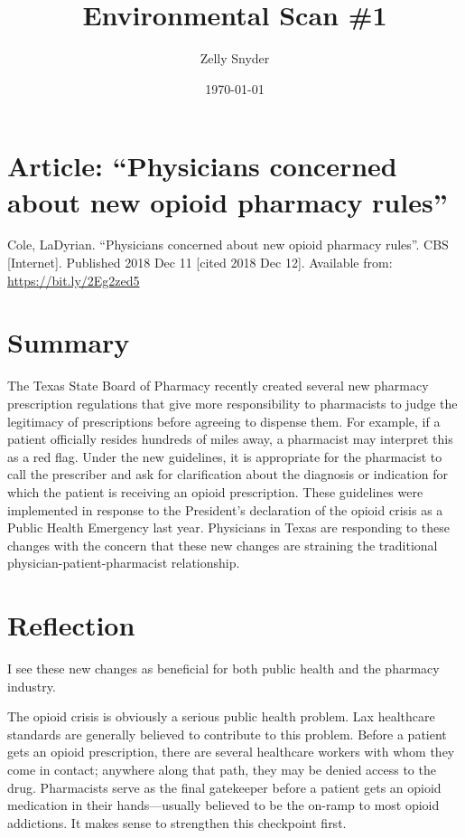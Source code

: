\documentclass[11.5pt]{article}
\begin{document}
\title{Environmental Scan \#1}
\author{Zelly Snyder}
\date{\today}
\maketitle

\section{Article: ``Physicians concerned about new opioid pharmacy rules''}
Cole, LaDyrian. ``Physicians concerned about new opioid pharmacy rules''. CBS [Internet]. Published 2018 Dec 11 [cited 2018 Dec 12]. Available from: \href{https://www.cbs19.tv/article/news/local/physicians-concerned-about-new-opioid-pharmacy-rules/501-623011135}{https://bit.ly/2Eg2zed5}

\section{Summary}
The Texas State Board of Pharmacy recently created several new pharmacy prescription regulations that give more responsibility to pharmacists to judge the legitimacy of prescriptions before agreeing to dispense them. For example, if a patient officially resides hundreds of miles away, a pharmacist may interpret this as a red flag. Under the new guidelines, it is appropriate for the pharmacist to call the prescriber and ask for clarification about the diagnosis or indication for which the patient is receiving an opioid prescription. These guidelines were implemented in response to the President's declaration of the opioid crisis as a Public Health Emergency last year. Physicians in Texas are responding to these changes with the concern that these new changes are straining the traditional physician-patient-pharmacist relationship.

\section{Reflection}
I see these new changes as beneficial for both public health and the pharmacy industry.

The opioid crisis is obviously a serious public health problem. Lax healthcare standards are generally believed to contribute to this problem. Before a patient gets an opioid prescription, there are several healthcare workers with whom they come in contact; anywhere along that path, they may be denied access to the drug. Pharmacists serve as the final gatekeeper before a patient gets an opioid medication in their hands---usually believed to be the on-ramp to most opioid addictions. It makes sense to strengthen this checkpoint first.
\end{document}
